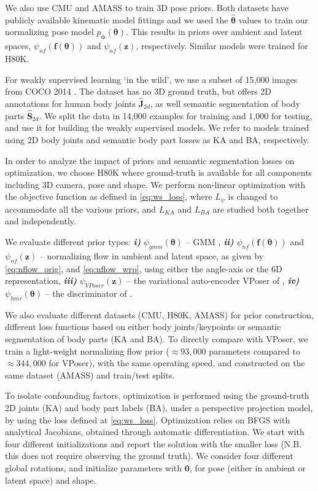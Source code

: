 \documentclass[runningheads]{llncs}
\newcommand{\thetab}{\bm{\theta}}
\newcommand{\bphi}{\bm{\phi}}
\newcommand{\zz}{\mathbf{z}}
\newcommand{\ff}{\mathbf{f}}
\begin{document}
We also use CMU \cite{cmu2018} and AMASS \cite{mahmood2019amass} to train 3D pose priors. Both datasets have publicly available kinematic model fittings and we used the $\widehat{\thetab}$ values to train our normalizing pose model $p_{\bphi}(\thetab)$. This results in priors over ambient and latent spaces, $\psi_{nf}(\ff(\thetab))$ and $\psi_{nf}(\zz)$, respectively. Similar models were trained for H80K. 

For weakly supervised learning `in the wild', we use a subset of 15,000 images from COCO 2014 \cite{MsCOCO}. 
The dataset has no 3D ground truth, but offers 2D annotations for human body joints $\widehat{\mathbf{J}}_{2d}$, as well semantic segmentation of body parts $\widehat{\mathbf{S}}_{2d}$.  We split the data in 14,000 examples for training and 1,000 for testing, and use it for building the weakly supervised models. We refer to models trained using 2D body joints and semantic body part losses as KA and BA, respectively.

 In order to analyze the impact of priors and semantic segmentation losses on optimization, we choose H80K where ground-truth is available for all components including 3D camera, pose and shape. We perform non-linear optimization with the objective function as defined in \eqref{eq:ws_loss}, where $L_{\psi}$ is changed to accommodate all the various priors, and $L_{KA}$ and $L_{BA}$ are studied both together and independently.

We evaluate different prior types: \textit{\bf i)} $\psi_{gmm}(\thetab)$ -- GMM \cite{bogo2016}, \textit{\bf ii)} $\psi_{nf}(\ff(\thetab))$ and $\psi_{nf}(\zz)$ -- normalizing flow in ambient and latent space, as given by \eqref{eq:nflow_orig}, and \eqref{eq:nflow_wrp}, using either the angle-axis or the 6D representation, \textit{\bf iii)}  $\psi_{VPoser}(\zz)$ -- the variational auto-encoder VPoser of \cite{pavlakoscvpr2019}, \textit{\bf iv)} $\psi_{hmr}(\thetab)$ -- the discriminator of \cite{Kanazawa2018}. 
 
We also evaluate different datasets (CMU, H80K, AMASS) for prior construction, different loss functions based on either body joints/keypoints or semantic segmentation of body parts (KA and BA). To directly compare with VPoser, we train a light-weight normalizing flow prior ($\approx 93,000$ parameters compared to $\approx 344,000$ for VPoser), with the same operating speed, and constructed on the same dataset (AMASS) and train/test splits. 

To isolate confounding factors, optimization is performed using the ground-truth 2D joints (KA) and body part labels (BA), under a perspective projection model, by using the loss defined at \eqref{eq:ws_loss}. Optimization relies on BFGS with analytical Jacobians, obtained through automatic differentiation. We start with four different initializations and report the solution with the smaller loss (N.B. this does not require observing the ground truth). We consider four different global rotations, and initialize parameters with $\mathbf{0}$, for pose (either in ambient or latent space) and shape.
\end{document}
